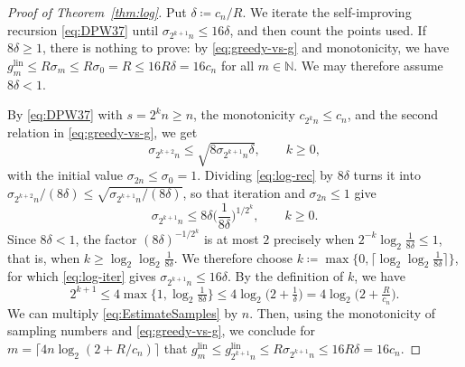 \documentclass[11pt,reqno, a4paper]{article}
\numberwithin{equation}{section}
\newcommand{\N}{\mathbb{N}}
\newcommand{\lin}{\ensuremath{\mathrm{lin}}}
\begin{document}
\begin{proof}[Proof of Theorem~\ref{thm:log}]
Put $\delta\coloneqq c_n/R$.
We iterate the self-improving recursion \eqref{eq:DPW37} until $\sigma_{2^{k+1}n}\le 16\delta$, and then count the points used.
If $8\delta\ge1$, there is nothing to prove:
by \eqref{eq:greedy-vs-g} and monotonicity, we have $g_m^{\lin}\le R\sigma_m\le R\sigma_0=R\le16R\delta=16c_n$ for all $m \in \N$.
We may therefore assume $8\delta<1$.

By \eqref{eq:DPW37} with $s=2^kn\ge n$, the monotonicity $c_{2^kn}\le c_n$, and the second relation in \eqref{eq:greedy-vs-g}, we get
\begin{equation}\label{eq:log-rec}
\sigma_{2^{k+2}n}\le \sqrt{8\sigma_{2^{k+1}n}\delta},\qquad k\ge0,
\end{equation}
with the initial value $\sigma_{2n}\le\sigma_0=1$.
Dividing \eqref{eq:log-rec} by $8 \delta$ turns it into $\sigma_{2^{k+2}n}/(8\delta)\le\sqrt{\sigma_{2^{k+1}n}/(8\delta)}$, so that iteration and $\sigma_{2n}\le1$ give
\begin{equation}\label{eq:log-iter}
    \sigma_{2^{k+1}n}\le 8\delta \Big(\frac{1}{8\delta}\Big)^{1/2^k}, \qquad k\ge0 .
\end{equation}
Since $8\delta<1$, the factor $(8\delta)^{-1/2^k}$ is at most $2$ precisely when $2^{-k}\log_2\frac{1}{8\delta}\le1$, that is, when $k\ge\log_2\log_2\frac{1}{8\delta}$.
We therefore choose $k\coloneqq\max\bigl\{0,\lceil\log_2\log_2\tfrac{1}{8\delta}\rceil\bigr\}$, for which \eqref{eq:log-iter} gives $\sigma_{2^{k+1}n}\le16\delta$.
By the definition of $k$, we have
\begin{equation}\label{eq:EstimateSamples}
    2^{k+1}\le4\max\{1,\log_2 \tfrac{1}{8\delta}\}\le4\log_2\bigl(2+\tfrac{1}{\delta}\bigr)=4\log_2\bigl(2+\tfrac{R}{c_n}\bigr).
\end{equation}
We can multiply \eqref{eq:EstimateSamples} by $n$.
Then, using the monotonicity of sampling numbers and \eqref{eq:greedy-vs-g}, we conclude  for $m = \lceil 4n\log_2(2+R/c_n) \rceil$ that $g_m^{\lin}\le g_{2^{k+1}n}^{\lin}\le R\sigma_{2^{k+1}n}\le16R\delta=16c_n$.
\end{proof}
\end{document}
